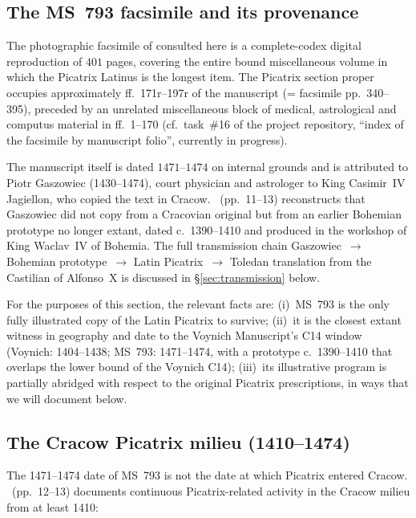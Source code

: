 \subsection{The MS~793 facsimile and its provenance}
\label{sec:facsimile}

The photographic facsimile of \bjms{} consulted here is a complete-codex
digital reproduction of $401$ pages, covering the entire bound
miscellaneous volume in which the Picatrix Latinus is the longest item.
The Picatrix section proper occupies approximately ff.~171r--197r of the
manuscript (= facsimile pp.~340--395), preceded by an unrelated
miscellaneous block of medical, astrological and computus material in
ff.~1--170 (cf.\ task~\#16 of the project repository, ``index of the
\bjms{} facsimile by manuscript folio'', currently in progress).

The manuscript itself is dated $1471$--$1474$ on internal grounds and is
attributed to Piotr Gaszowiec (1430--1474), court physician and
astrologer to King Casimir~IV Jagiellon, who copied the text in Cracow.
\citet{sniezynska2009}~(pp.~11--13) reconstructs that Gaszowiec did not
copy from a Cracovian original but from an earlier Bohemian prototype no
longer extant, dated c.~1390--1410 and produced in the workshop of King
Waclav~IV of Bohemia. The full transmission chain Gaszowiec~$\rightarrow$
Bohemian prototype~$\rightarrow$ Latin Picatrix~$\rightarrow$ Toledan
translation from the Castilian of Alfonso~X is discussed in
\S\ref{sec:transmission} below.

For the purposes of this section, the relevant facts are: (i)~MS~793 is
the only fully illustrated copy of the Latin Picatrix to survive; (ii)~it
is the closest extant witness in geography and date to the Voynich
Manuscript's C14 window (Voynich: 1404--1438; MS~793: 1471--1474, with a
prototype c.~1390--1410 that overlaps the lower bound of the Voynich
C14); (iii)~its illustrative program is partially abridged with respect
to the original Picatrix prescriptions, in ways that we will document
below.

\subsection{The Cracow Picatrix milieu (1410--1474)}
\label{sec:cracow_milieu}

The 1471--1474 date of MS~793 is not the date at which Picatrix entered
Cracow. \citet{sniezynska2009}~(pp.~12--13) documents continuous
Picatrix-related activity in the Cracow milieu from at least 1410:

